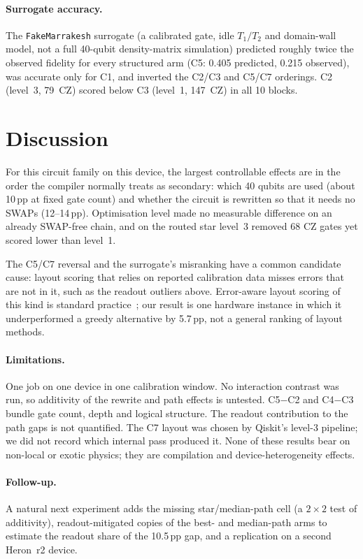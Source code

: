 \documentclass[10pt,twocolumn]{article}
\begin{document}
\paragraph{Surrogate accuracy.} The \texttt{FakeMarrakesh} surrogate (a calibrated gate, idle
$T_1/T_2$ and domain-wall model, not a full 40-qubit density-matrix simulation) predicted roughly
twice the observed fidelity for every structured arm (C5: 0.405 predicted, 0.215 observed), was
accurate only for C1, and inverted the C2/C3 and C5/C7 orderings. C2 (level~3, 79~CZ) scored below
C3 (level~1, 147~CZ) in all 10 blocks.

\section{Discussion}
For this circuit family on this device, the largest controllable effects are in the order the
compiler normally treats as secondary: which 40 qubits are used (about 10\,pp at fixed gate count)
and whether the circuit is rewritten so that it needs no SWAPs (12--14\,pp). Optimisation level made
no measurable difference on an already SWAP-free chain, and on the routed star level~3 removed 68 CZ
gates yet scored lower than level~1.

The C5/C7 reversal and the surrogate's misranking have a common candidate cause: layout scoring
that relies on reported calibration data misses errors that are not in it, such as the readout
outliers above. Error-aware layout scoring of this kind is standard practice~\cite{nation2023}; our
result is one hardware instance in which it underperformed a greedy alternative by 5.7\,pp, not a
general ranking of layout methods.

\paragraph{Limitations.} One job on one device in one calibration window. No interaction contrast
was run, so additivity of the rewrite and path effects is untested. C5$-$C2 and C4$-$C3 bundle gate
count, depth and logical structure. The readout contribution to the path gaps is not quantified.
The C7 layout was chosen by Qiskit's level-3 pipeline; we did not record which internal pass
produced it. None of these results bear on non-local or exotic physics; they are compilation and
device-heterogeneity effects.

\paragraph{Follow-up.} A natural next experiment adds the missing star/median-path cell (a
$2\times2$ test of additivity), readout-mitigated copies of the best- and median-path arms to
estimate the readout share of the 10.5\,pp gap, and a replication on a second Heron~r2 device.
\end{document}
